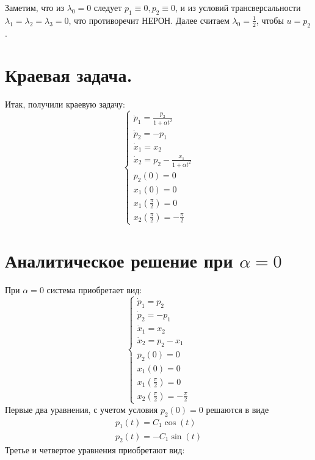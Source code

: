 \documentclass{article}
\begin{document}
Заметим, что из $\lambda_{0} = 0$ следует $p_{1} \equiv 0, p_{2}
\equiv 0$, и из условий
трансверсальности $\lambda_{1} = \lambda_{2} = \lambda_{3} = 0$, что
противоречит НЕРОН.
Далее считаем $\lambda_{0} = \frac{1}{2}$, чтобы $u = p_{2}$.
\section{Краевая задача.}
Итак, получили краевую задачу:
$$
\begin{cases}
  \dot p_{1} = \frac{p_{2}}{1 + \alpha t^{2}}\\
  \dot p_{2} = -p_{1}\\
  \dot x_{1} = x_{2}\\
  \dot x_{2} = p_{2} - \frac{x_{1}}{1 + \alpha t^{2}}\\
  p_{2}(0) = 0\\
  x_1(0) = 0\\
  x_{1}(\frac \pi 2) = 0\\
  x_2(\frac \pi 2) = -\frac \pi 2
\end{cases}$$
\section{Аналитическое решение при $\alpha = 0$}
При $\alpha = 0$ система приобретает вид:
$$
\begin{cases}
  \dot p_{1} = p_{2}\\
  \dot p_{2} = -p_{1}\\
  \dot x_{1} = x_{2}\\
  \dot x_{2} = p_{2} - x_{1}\\
  p_{2}(0) = 0\\
  x_1(0) = 0\\
  x_{1}(\frac \pi 2) = 0\\
  x_2(\frac \pi 2) = -\frac \pi 2
\end{cases}$$
Первые два уравнения, с учетом условия $p_{2}(0) = 0$ решаются в виде
\begin{gather*}
  p_{1}(t) = C_{1}\cos(t)\\
  p_{2}(t) = -C_{1}\sin(t)
\end{gather*}
Третье и четвертое уравнения приобретают вид:
\end{document}

